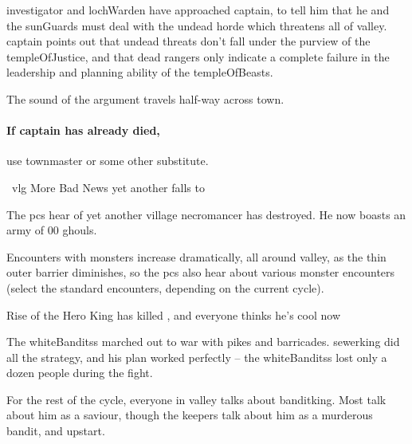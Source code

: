 \Gls{investigator} and \gls{lochWarden} have approached \gls{captain}, to tell him that he and the \glspl{sunGuard} must deal with the undead horde which threatens all of \gls{valley}.
\Gls{captain} points out that undead threats don't fall under the purview of the \gls{templeOfJustice}, and that dead \glspl{ranger} only indicate a complete failure in the leadership and planning ability of the \gls{templeOfBeasts}.

The sound of the argument travels half-way across \gls{town}.

\paragraph{If \gls{captain} has already died,}
use \gls{townmaster} or some other substitute.

{\squash~\gls{vlg} More Bad News}%
{yet another  falls to }%

The \glspl{pc} hear of yet another \gls{village} \gls{necromancer} has destroyed.
He now boasts an army of 00 ghouls.

Encounters with \glspl{monster} increase dramatically, all around \gls{valley}, as the thin outer barrier diminishes,%
so the \glspl{pc} also hear about various \gls{monster} encounters (select the standard encounters, depending on the current \gls{cycle}).

{Rise of the Hero King}%
{ has killed , and everyone thinks he's cool now}%

The \glspl{whiteBandits} marched out to war with pikes and barricades.
\Gls{sewerking} did all the strategy, and his plan worked perfectly -- the \glspl{whiteBandits} lost only a dozen people during the fight.

For the rest of the \gls{cycle}, everyone in \gls{valley} talks about \gls{banditking}.
Most talk about him as a saviour, though the \glspl{keeper} talk about him as a murderous bandit, and upstart.
